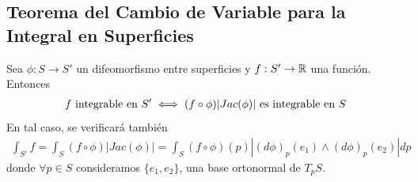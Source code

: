 \subsection{Teorema del Cambio de Variable para la Integral en Superficies}
\begin{teo}\label{teo:cambio_variable_integral_sup}
    Sea $\phi: S \to S'$ un difeomorfismo entre superficies y $f: S'\to \mathbb{R}$ una función. Entonces
    \begin{gather*}
        f \text{ integrable en $S'$} \iff (f\circ \phi)|Jac(\phi)|\text{ es integrable en $S$}
    \end{gather*}
    En tal caso, se verificará también
    \begin{gather*}
        \int_{S'}f = \int_S (f\circ \phi) |Jac(\phi)| = \int_S (f\circ \phi)(p)|(d\phi)_p(e_1) \wedge (d\phi)_p(e_2)| dp
    \end{gather*}
    donde $\forall p \in S$ consideramos $\{e_1, e_2\}$, una base ortonormal de $T_pS$.


\end{teo}
